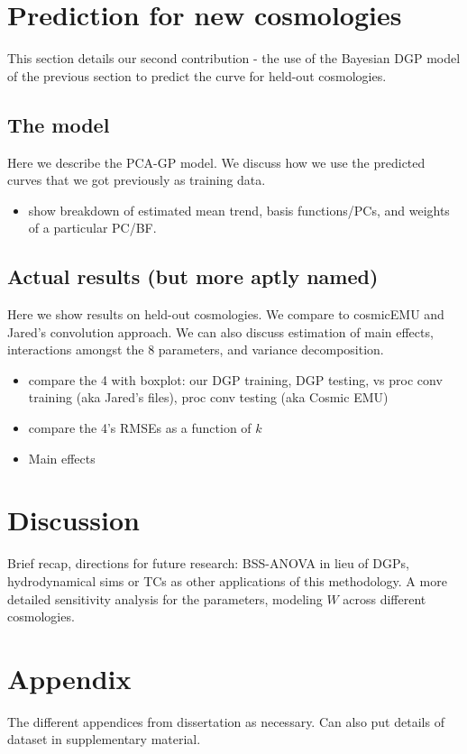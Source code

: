 \documentclass[11pt]{article}
\begin{document}
\section{Prediction for new cosmologies}

This section details our second contribution - the use of the Bayesian DGP model of the previous section to predict the curve for held-out cosmologies.

\subsection{The model}

Here we describe the PCA-GP model.  We discuss how we use the predicted curves that we got previously as training data.

\begin{itemize}
    \item show breakdown of estimated mean trend, basis functions/PCs, and weights of a particular PC/BF.
\end{itemize}

\subsection{Actual results (but more aptly named)}

Here we show results on held-out cosmologies.  We compare to cosmicEMU and Jared's convolution approach. We can also discuss estimation of main effects, interactions amongst the 8 parameters, and variance decomposition.

\begin{itemize}
    \item compare the 4 with boxplot: our DGP training, DGP testing, vs proc conv training (aka Jared's files), proc conv testing (aka Cosmic EMU)
    \item compare the 4's RMSEs as a function of $k$
    \item Main effects
\end{itemize}

\section{Discussion}

Brief recap, directions for future research: BSS-ANOVA in lieu of DGPs, hydrodynamical sims or TCs as other applications of this methodology. A more detailed sensitivity analysis for the parameters, modeling $W$ across different cosmologies.

\section{Appendix}

The different appendices from dissertation as necessary. Can also put details of dataset in supplementary material.



\end{document}
